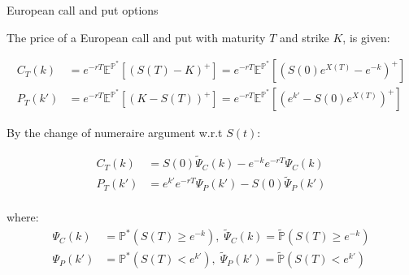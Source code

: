 \documentclass{beamer}
\begin{document}
\begin{frame}{European call and put options}

    {\footnotesize \footnotesize
    \par The price of a European call and put with maturity \( T \) and strike \( K \), is given:
    
    \begin{align*}
        C_T(k) &= e^{-rT} \mathbb{E}^{\mathbb{P}^*} [(S(T) - K)^+] = e^{-rT} \mathbb{E}^{\mathbb{P}^*} \left[ (S(0)e^{X(T)} - e^{-k})^+ \right]\\
        P_T(k')& = e^{-rT} \mathbb{E}^{\mathbb{P}^*} [(K - S(T))^+] = e^{-rT} \mathbb{E}^{\mathbb{P}^*} \left[ (e^{k'} - S(0)e^{X(T)})^+ \right]
    \end{align*}
    
    \par By the change of numeraire argument w.r.t $S(t)$:
    
    \begin{align*}
       C_T(k) &= S(0) \tilde{\Psi}_C(k) - e^{-k} e^{-rT} \Psi_C(k)\\
        P_T(k') &= e^{k'} e^{-rT} \Psi_P(k') - S(0) \tilde{\Psi}_P(k')\\
    \end{align*}
    
    \vspace{-2em}
    \par where: 
    \begin{align*}
      \Psi_C(k) &= \mathbb{P}^*(S(T) \geq e^{-k}),\;\tilde{\Psi}_C(k) = \tilde{\mathbb{P}}(S(T) \geq e^{-k})\\
      \Psi_P(k') &= \mathbb{P}^*(S(T) < e^{k'}), \; \tilde{\Psi}_P(k') = \tilde{\mathbb{P}}(S(T) < e^{k'})
    \end{align*}
    }
    
\end{frame}
\end{document}
